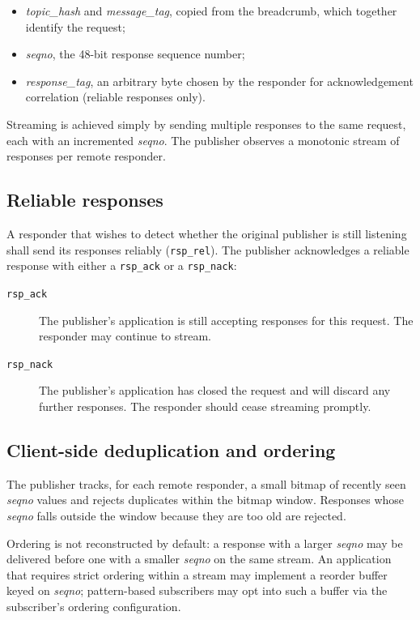 \begin{itemize}
    \item \textit{topic\_hash} and \textit{message\_tag}, copied from the
    breadcrumb, which together identify the request;
    \item \textit{seqno}, the 48-bit response sequence number;
    \item \textit{response\_tag}, an arbitrary byte chosen by the responder
    for acknowledgement correlation (reliable responses only).
\end{itemize}

Streaming is achieved simply by sending multiple responses to the same
request, each with an incremented \textit{seqno}. The publisher observes a
monotonic stream of responses per remote responder.

\subsection{Reliable responses}

A responder that wishes to detect whether the original publisher is still
listening shall send its responses reliably (\texttt{rsp\_rel}). The
publisher acknowledges a reliable response with either a \texttt{rsp\_ack}
or a \texttt{rsp\_nack}:

\begin{description}
    \item[\texttt{rsp\_ack}] The publisher's application is still accepting
    responses for this request. The responder may continue to stream.

    \item[\texttt{rsp\_nack}] The publisher's application has closed the
    request and will discard any further responses. The responder should
    cease streaming promptly.
\end{description}

\subsection{Client-side deduplication and ordering}

The publisher tracks, for each remote responder, a small bitmap of recently
seen \textit{seqno} values and rejects duplicates within the bitmap window.
Responses whose \textit{seqno} falls outside the window because they are too
old are rejected.

Ordering is not reconstructed by default: a response with a larger
\textit{seqno} may be delivered before one with a smaller \textit{seqno}
on the same stream. An application that requires strict ordering within a
stream may implement a reorder buffer keyed on \textit{seqno}; pattern-based
subscribers may opt into such a buffer via the subscriber's ordering
configuration.

